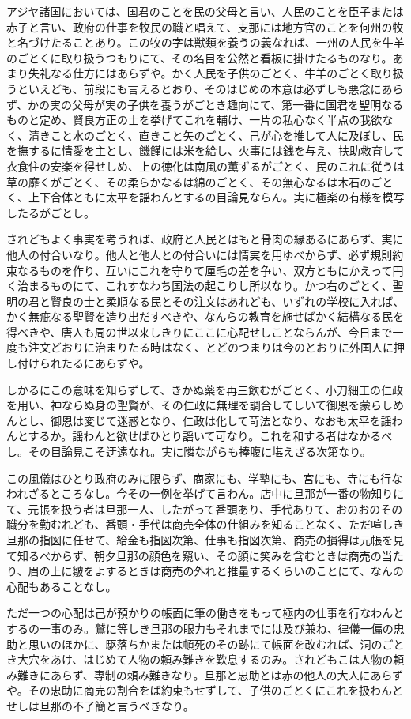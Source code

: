\documentclass[a4paper, platex, dvipdfmx]{jsarticle}
\begin{document}
アジヤ諸国においては、国君のことを民の父母と言い、人民のことを臣子または赤子と言い、政府の仕事を牧民の職と唱えて、支那には地方官のことを何州の牧と名づけたることあり。この牧の字は獣類を養うの義なれば、一州の人民を牛羊のごとくに取り扱うつもりにて、その名目を公然と看板に掛けたるものなり。あまり失礼なる仕方にはあらずや。かく人民を子供のごとく、牛羊のごとく取り扱うといえども、前段にも言えるとおり、そのはじめの本意は必ずしも悪念にあらず、かの実の父母が実の子供を養うがごとき趣向にて、第一番に国君を聖明なるものと定め、賢良方正の士を挙げてこれを輔け、一片の私心なく半点の我欲なく、清きこと水のごとく、直きこと矢のごとく、己が心を推して人に及ぼし、民を撫するに情愛を主とし、饑饉には米を給し、火事には銭を与え、扶助救育して衣食住の安楽を得せしめ、上の徳化は南風の薫ずるがごとく、民のこれに従うは草の靡くがごとく、その柔らかなるは綿のごとく、その無心なるは木石のごとく、上下合体ともに太平を謡わんとするの目論見ならん。実に極楽の有様を模写したるがごとし。

されどもよく事実を考うれば、政府と人民とはもと骨肉の縁あるにあらず、実に他人の付合いなり。他人と他人との付合いには情実を用ゆべからず、必ず規則約束なるものを作り、互いにこれを守りて厘毛の差を争い、双方ともにかえって円く治まるものにて、これすなわち国法の起こりし所以なり。かつ右のごとく、聖明の君と賢良の士と柔順なる民とその注文はあれども、いずれの学校に入れば、かく無疵なる聖賢を造り出だすべきや、なんらの教育を施せばかく結構なる民を得べきや、唐人も周の世以来しきりにここに心配せしことならんが、今日まで一度も注文どおりに治まりたる時はなく、とどのつまりは今のとおりに外国人に押し付けられたるにあらずや。

しかるにこの意味を知らずして、きかぬ薬を再三飲むがごとく、小刀細工の仁政を用い、神ならぬ身の聖賢が、その仁政に無理を調合してしいて御恩を蒙らしめんとし、御恩は変じて迷惑となり、仁政は化して苛法となり、なおも太平を謡わんとするか。謡わんと欲せばひとり謡いて可なり。これを和する者はなかるべし。その目論見こそ迂遠なれ。実に隣ながらも捧腹に堪えざる次第なり。

この風儀はひとり政府のみに限らず、商家にも、学塾にも、宮にも、寺にも行なわれざるところなし。今その一例を挙げて言わん。店中に旦那が一番の物知りにて、元帳を扱う者は旦那一人、したがって番頭あり、手代ありて、おのおのその職分を勤むれども、番頭・手代は商売全体の仕組みを知ることなく、ただ喧しき旦那の指図に任せて、給金も指図次第、仕事も指図次第、商売の損得は元帳を見て知るべからず、朝夕旦那の顔色を窺い、その顔に笑みを含むときは商売の当たり、眉の上に皺をよするときは商売の外れと推量するくらいのことにて、なんの心配もあることなし。

ただ一つの心配は己が預かりの帳面に筆の働きをもって極内の仕事を行なわんとするの一事のみ。鷲に等しき旦那の眼力もそれまでには及び兼ね、律儀一偏の忠助と思いのほかに、駆落ちかまたは頓死のその跡にて帳面を改むれば、洞のごとき大穴をあけ、はじめて人物の頼み難きを歎息するのみ。されどもこは人物の頼み難きにあらず、専制の頼み難きなり。旦那と忠助とは赤の他人の大人にあらずや。その忠助に商売の割合をば約束もせずして、子供のごとくにこれを扱わんとせしは旦那の不了簡と言うべきなり。
\end{document}
